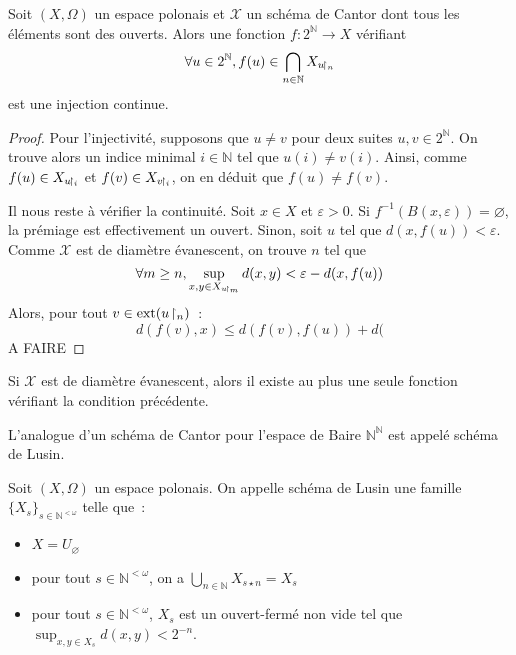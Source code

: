 \begin{proposition}\label{desc.prop.schem.C}
  Soit $(X,\Omega)$ un espace polonais et $\mathcal X$ un schéma de Cantor dont
  tous les éléments sont des ouverts. Alors une fonction
  $f : 2^{\mathbb N} \to X$ vérifiant
  \[\forall u \in 2^{\mathbb N}, f(u) \in \bigcap_{n \in \mathbb N}X_{u\!\upharpoonright_{n}}\]
  est une injection continue.
\end{proposition}

\begin{proof}
  Pour l'injectivité, supposons que $u \neq v$ pour deux suites
  $u,v\in 2^{\mathbb N}$. On trouve alors un indice minimal $i\in\mathbb N$ tel
  que $u(i) \neq v(i)$. Ainsi, comme $f(u) \in X_{u\!\upharpoonright_{i}}$ et
  $f(v)\in X_{v\!\upharpoonright_{i}}$, on en déduit que $f(u) \neq f(v)$.

  Il nous reste à vérifier la continuité. Soit $x\in X$ et $\varepsilon > 0$.
  Si $f^{-1}(B(x,\varepsilon)) = \varnothing$, la prémiage est effectivement un
  ouvert. Sinon, soit $u$ tel que $d(x,f(u)) < \varepsilon$. Comme $\mathcal X$
  est de diamètre évanescent, on trouve $n$ tel que
  \[\forall m \geq n, \sup_{x,y \in X_{u\!\upharpoonright_{m}}} d(x,y) <
  \varepsilon - d(x,f(u))\]
  Alors, pour tout $v \in \operatorname{ext}(u\!\upharpoonright_{n})$~:
  \[d(f(v),x) \leq d(f(v),f(u)) + d(\] A FAIRE
\end{proof}

\begin{remark}
  Si $\mathcal X$ est de diamètre évanescent, alors il existe au plus une seule
  fonction vérifiant la condition précédente.
\end{remark}

L'analogue d'un schéma de Cantor pour l'espace de Baire $\mathbb N^\mathbb N$
est appelé schéma de Lusin.

\begin{definition}
  Soit $(X,\Omega)$ un espace polonais. On appelle schéma de Lusin une famille
  $\{X_s\}_{s\in \mathbb N^{<\omega}}$ telle que~:
  \begin{itemize}
  \item $X = U_{\varnothing}$
  \item pour tout $s\in \mathbb N^{<\omega}$, on a
    $\displaystyle \bigcup_{n\in\mathbb N} X_{s\star n} = X_s$
  \item pour tout $s\in\mathbb N^{<\omega}$, $X_s$ est un ouvert-fermé non vide
    tel que $\displaystyle\sup_{x,y\in X_s} d(x,y) < 2^{-n}$.
  \end{itemize}
\end{definition}


